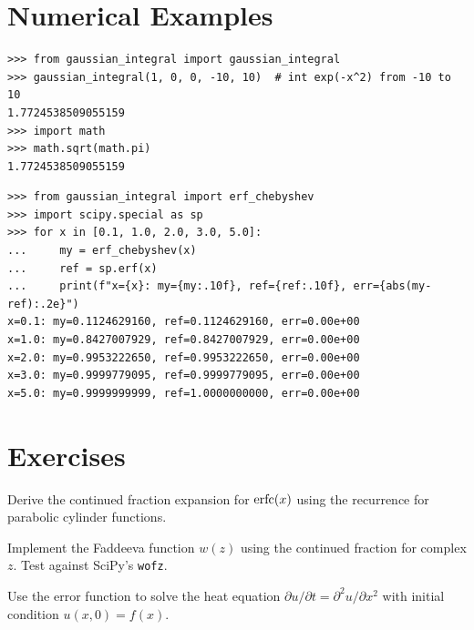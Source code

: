 \section{Numerical Examples}

\begin{example}
\begin{lstlisting}[style=python]
>>> from gaussian_integral import gaussian_integral
>>> gaussian_integral(1, 0, 0, -10, 10)  # int exp(-x^2) from -10 to 10
1.7724538509055159
>>> import math
>>> math.sqrt(math.pi)
1.7724538509055159
\end{lstlisting}
\end{example}

\begin{example}
\begin{lstlisting}[style=python]
>>> from gaussian_integral import erf_chebyshev
>>> import scipy.special as sp
>>> for x in [0.1, 1.0, 2.0, 3.0, 5.0]:
...     my = erf_chebyshev(x)
...     ref = sp.erf(x)
...     print(f"x={x}: my={my:.10f}, ref={ref:.10f}, err={abs(my-ref):.2e}")
x=0.1: my=0.1124629160, ref=0.1124629160, err=0.00e+00
x=1.0: my=0.8427007929, ref=0.8427007929, err=0.00e+00
x=2.0: my=0.9953222650, ref=0.9953222650, err=0.00e+00
x=3.0: my=0.9999779095, ref=0.9999779095, err=0.00e+00
x=5.0: my=0.9999999999, ref=1.0000000000, err=0.00e+00
\end{lstlisting}
\end{example}

\section{Exercises}

\begin{exercise}
Derive the continued fraction expansion for $\operatorname{erfc}(x)$ using the recurrence for parabolic cylinder functions.
\end{exercise}

\begin{exercise}
Implement the Faddeeva function $w(z)$ using the continued fraction for complex $z$. Test against SciPy's \texttt{wofz}.
\end{exercise}

\begin{exercise}
Use the error function to solve the heat equation $\partial u/\partial t = \partial^2 u/\partial x^2$ with initial condition $u(x,0) = f(x)$.
\end{exercise}

